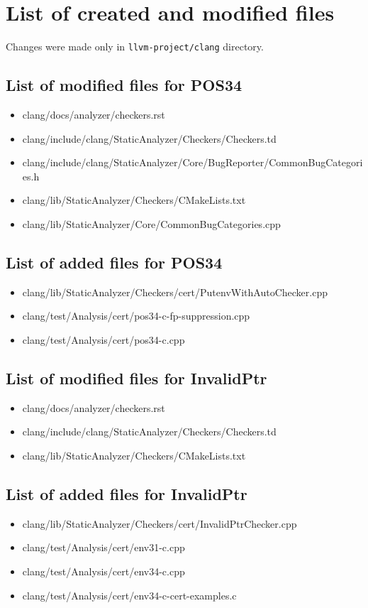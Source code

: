 \chapter{List of created and modified files} %
\label{appx:files}

Changes were made only in \lstinline{llvm-project/clang} directory.


\section{List of modified files for POS34}

\begin{itemize}
    \item clang/docs/analyzer/checkers.rst
    \item clang/include/clang/StaticAnalyzer/Checkers/Checkers.td
    \item clang/include/clang/StaticAnalyzer/Core/BugReporter/CommonBugCategories.h
    \item clang/lib/StaticAnalyzer/Checkers/CMakeLists.txt
    \item clang/lib/StaticAnalyzer/Core/CommonBugCategories.cpp
\end{itemize}

\section{List of added files for POS34}

\begin{itemize}
    \item clang/lib/StaticAnalyzer/Checkers/cert/PutenvWithAutoChecker.cpp
    \item clang/test/Analysis/cert/pos34-c-fp-suppression.cpp
    \item clang/test/Analysis/cert/pos34-c.cpp
\end{itemize}

\section{List of modified files for InvalidPtr}

\begin{itemize}
    \item clang/docs/analyzer/checkers.rst
    \item clang/include/clang/StaticAnalyzer/Checkers/Checkers.td
    \item clang/lib/StaticAnalyzer/Checkers/CMakeLists.txt
\end{itemize}

\section{List of added files for InvalidPtr}

\begin{itemize}
    \item clang/lib/StaticAnalyzer/Checkers/cert/InvalidPtrChecker.cpp
    \item clang/test/Analysis/cert/env31-c.cpp
    \item clang/test/Analysis/cert/env34-c.cpp
    \item clang/test/Analysis/cert/env34-c-cert-examples.c
\end{itemize}